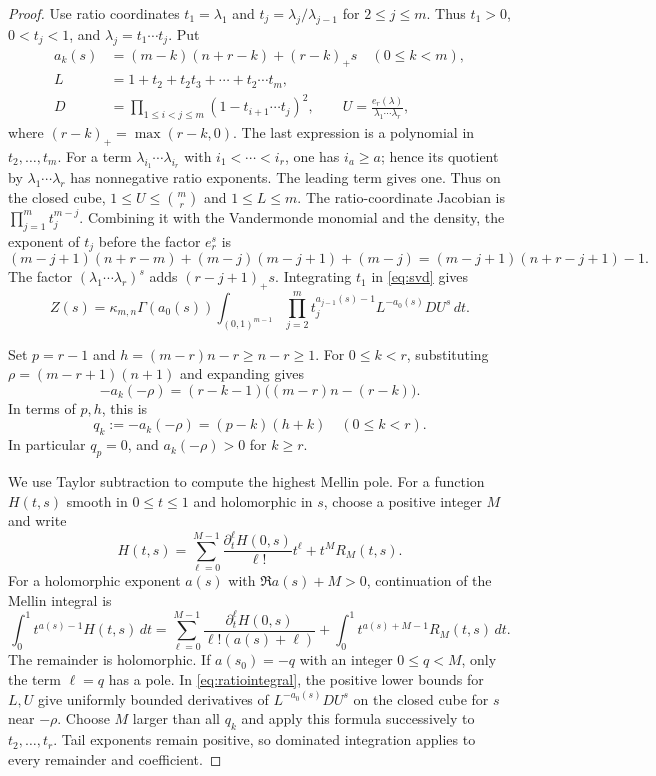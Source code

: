 \documentclass[11pt,a4paper]{article}
\numberwithin{equation}{section}
\theoremstyle{definition}
\begin{document}
\begin{proof}
Use ratio coordinates $t_1=\lambda_1$ and
$t_j=\lambda_j/\lambda_{j-1}$ for $2\le j\le m$.
Thus $t_1>0$, $0<t_j<1$, and $\lambda_j=t_1\cdots t_j$.
Put
\begin{align*}
a_k(s)&=(m-k)(n+r-k)+(r-k)_+s\quad(0\le k<m),\\
L&=1+t_2+t_2t_3+\cdots+t_2\cdots t_m,\\
D&=\prod_{1\le i<j\le m}(1-t_{i+1}\cdots t_j)^2,\qquad
U=\frac{e_r(\lambda)}{\lambda_1\cdots\lambda_r},
\end{align*}
where $(r-k)_+=\max(r-k,0)$. The last expression is a polynomial
in $t_2,\ldots,t_m$. For a term $\lambda_{i_1}\cdots\lambda_{i_r}$
with $i_1<\cdots<i_r$, one has $i_a\ge a$; hence its quotient by
$\lambda_1\cdots\lambda_r$ has nonnegative ratio exponents.
The leading term gives one. Thus on the closed cube,
$1\le U\le\binom mr$ and $1\le L\le m$.
The ratio-coordinate Jacobian is $\prod_{j=1}^m t_j^{m-j}$.
Combining it with the Vandermonde monomial and the density, the
exponent of $t_j$ before the factor $e_r^s$ is
\[
(m-j+1)(n+r-m)+(m-j)(m-j+1)+(m-j)
=(m-j+1)(n+r-j+1)-1.
\]
The factor $(\lambda_1\cdots\lambda_r)^s$ adds
$(r-j+1)_+s$.
Integrating $t_1$ in \eqref{eq:svd} gives
\begin{equation}\label{eq:ratiointegral}
Z(s)=\kappa_{m,n}\Gamma(a_0(s))
\int_{(0,1)^{m-1}}\prod_{j=2}^m t_j^{a_{j-1}(s)-1}
                         L^{-a_0(s)}DU^s\,dt.
\end{equation}

Set $p=r-1$ and $h=(m-r)n-r\ge n-r\ge1$.
For $0\le k<r$, substituting $\rho=(m-r+1)(n+1)$ and expanding gives
\[
-a_k(-\rho)=(r-k-1)\big((m-r)n-(r-k)\big).
\]
In terms of $p,h$, this is
\begin{equation}\label{eq:qk}
q_k:=-a_k(-\rho)=(p-k)(h+k)\quad(0\le k<r).
\end{equation}
In particular $q_p=0$, and $a_k(-\rho)>0$ for $k\ge r$.

We use Taylor subtraction to compute the highest Mellin pole.
For a function $H(t,s)$ smooth in $0\le t\le1$ and holomorphic in
$s$, choose a positive integer $M$ and write
\[
H(t,s)=\sum_{\ell=0}^{M-1}\frac{\partial_t^\ell H(0,s)}{\ell!}t^\ell
       +t^M R_M(t,s).
\]
For a holomorphic exponent $a(s)$ with $\Re a(s)+M>0$,
continuation of the Mellin integral is
\[
\int_0^1t^{a(s)-1}H(t,s)\,dt
=\sum_{\ell=0}^{M-1}
 \frac{\partial_t^\ell H(0,s)}{\ell!(a(s)+\ell)}
 +\int_0^1t^{a(s)+M-1}R_M(t,s)\,dt.
\]
The remainder is holomorphic. If $a(s_0)=-q$ with an integer
$0\le q<M$, only the term
$\ell=q$ has a pole. In \eqref{eq:ratiointegral}, the positive
lower bounds for $L,U$ give uniformly bounded derivatives of
$L^{-a_0(s)}DU^s$ on the closed cube for $s$ near $-\rho$.
Choose $M$ larger than all $q_k$ and apply this formula successively
to $t_2,\ldots,t_r$. Tail exponents remain positive, so dominated
integration applies to every remainder and coefficient.


\end{proof}
\end{document}
